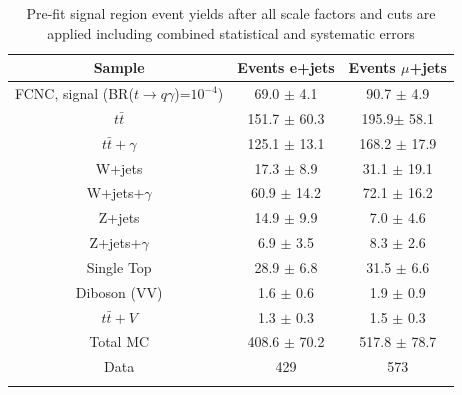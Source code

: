 \begin{table}[h!]
\begin{center}
{\renewcommand{\arraystretch}{1.2}
\begin{tabular}{ccc}
\hhline{===}
Sample  &  Events e+jets   & Events $\mu$+jets   \\  \hline 
FCNC, signal	(BR($t\rightarrow q\gamma$)=$10^{-4}$)		& 69.0 $\pm$ 4.1 & 90.7 $\pm$ 4.9\\
$t\bar{t}$            		& 151.7 $\pm$ 60.3 & 195.9$\pm$ 58.1\\
$t\bar{t}+\gamma$           & 125.1 $\pm$ 13.1 & 168.2 $\pm$ 17.9\\
W+jets			& 17.3 $\pm$ 8.9 & 31.1 $\pm$ 19.1\\   
W+jets+$\gamma$		& 60.9 $\pm$ 14.2 & 72.1 $\pm$ 16.2\\
Z+jets	            	& 14.9 $\pm$ 9.9 & 7.0 $\pm$ 4.6\\
Z+jets+$\gamma$		& 6.9 $\pm$ 3.5 & 8.3 $\pm$ 2.6\\
Single Top 		           & 28.9 $\pm$ 6.8 & 31.5 $\pm$ 6.6\\
Diboson (VV)		          	& 1.6 $\pm$ 0.6 & 1.9 $\pm$ 0.9\\
$t\bar{t}+V$	           & 1.3 $\pm$ 0.3 & 1.5 $\pm$ 0.3\\ \hline
Total MC 			& 408.6 $\pm$ 70.2 & 517.8 $\pm$ 78.7\\ \hline
Data		                     	& 429 & 573 \\ \hhline{===}
\end{tabular}
\caption{Pre-fit signal region event yields after all scale factors and cuts are applied including combined statistical and systematic errors }
\label{tab:SRYields}
}
\end{center}
\end{table}








